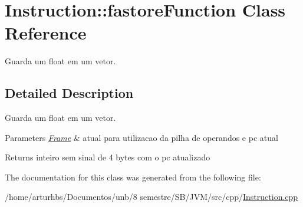 \hypertarget{classInstruction_1_1fastoreFunction}{}\section{Instruction\+:\+:fastore\+Function Class Reference}
\label{classInstruction_1_1fastoreFunction}


Guarda um float em um vetor.  




\subsection{Detailed Description}
Guarda um float em um vetor. 


\begin{DoxyParams}{Parameters}
{\em \hyperlink{classFrame}{Frame}} & atual para utilizacao da pilha de operandos e pc atual \\
\hline
\end{DoxyParams}
\begin{DoxyReturn}{Returns}
inteiro sem sinal de 4 bytes com o pc atualizado 
\end{DoxyReturn}


The documentation for this class was generated from the following file\+:\begin{DoxyCompactItemize}
\item 
/home/arturhbs/\+Documentos/unb/8 semestre/\+S\+B/\+J\+V\+M/src/cpp/\hyperlink{Instruction_8cpp}{Instruction.\+cpp}\end{DoxyCompactItemize}
